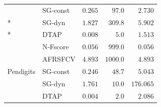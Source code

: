 \documentclass[]{interact}
\theoremstyle{plain}
\theoremstyle{definition}
\theoremstyle{remark}
\begin{document}
{\begin{longtable}{ll rrr}
                              & SG-const & $0.265$          & $97.0$          & $2.730$          \\*
                              & SG-dyn   & $1.827$          & $309.8$         & $5.902$          \\*
                              & DTAP     & $\mathbf{0.008}$ & $\mathbf{5.0}$  & $1.513$          \\
\midrule
\multirow{5}{*}{Pendigits}    & N-Fscore & $0.056$          & $999.0$         & $\mathbf{0.056}$ \\*
                              & AFRSFCV  & $4.893$          & $1000.0$        & $4.893$          \\*
                              & SG-const & $0.246$          & $48.7$          & $5.043$          \\*
                              & SG-dyn   & $1.761$          & $10.0$          & $176.065$        \\*
                              & DTAP     & $\mathbf{0.004}$ & $\mathbf{2.0}$  & $2.086$          \\
\end{longtable}
}
\end{document}
